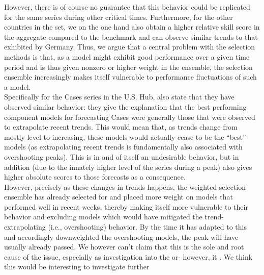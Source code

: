 However, there is of course no guarantee that this behavior could be replicated for the same series during other critical times. Furthermore, for the other countries in the set, we on the one hand also obtain a higher relative skill score in the aggregate compared to the benchmark and can observe similar trends to that exhibited by Germany. Thus, we argue that a central problem with the selection methods is that, as a model might exhibit good performance over a given time period and is thus given nonzero or higher weight in the ensemble, the selection ensemble increasingly makes itself vulnerable to performance fluctuations of such a model.\\ 
Specifically for the Cases series in the U.S. Hub, \cite{ray_comparing_2022} also state that they have observed similar behavior: they give the explanation that the best performing component models for forecasting Cases were generally those that were observed to extrapolate recent trends. This would mean that, as trends change from mostly level to increasing, these models would actually cease to be the ``best'' models (as extrapolating recent trends is fundamentally also associated with overshooting peaks). This is in and of itself an undesirable behavior, but in addition (due to the innately higher level of the series during a peak) also gives higher absolute scores to those forecasts as a consequence.\\
However, precisely as these changes in trends happens, the weighted selection ensemble has already selected for and placed more weight on models that performed well in recent weeks, thereby making itself more vulnerable to their behavior and excluding models which would have mitigated the trend-extrapolating (i.e., overshooting) behavior. By the time it has adapted to this and accordingly downweighted the overshooting models, the peak will have usually already passed. We however can't claim that this is the sole and root cause of the issue, especially as investigation into the or- however, it . We think this would be interesting to investigate further 

